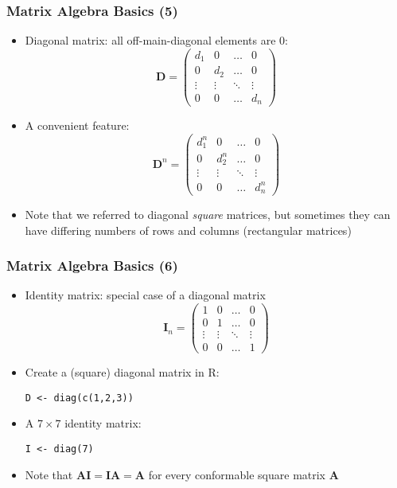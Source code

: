 \documentclass[10pt]{beamer}
\theoremstyle{definition}
\begin{document}
\begin{frame}[fragile]
\frametitle{Matrix Algebra Basics (5)}
\begin{itemize}
	\item Diagonal matrix: all off-main-diagonal elements are 0:
	\[
		\mathbf{D} = 
		\begin{pmatrix}
		d_{1} & 0 & \ldots & 0\\
		0 & d_{2} & \ldots & 0\\
		\vdots & \vdots & \ddots & \vdots\\
		0 & 0 & \ldots & d_{n}
		\end{pmatrix}
	\]
	\item A convenient feature:
	\[
		\mathbf{D}^{n} = 
		\begin{pmatrix}
		d_{1}^{n} & 0 & \ldots & 0\\
		0 & d_{2}^{n} & \ldots & 0\\
		\vdots & \vdots & \ddots & \vdots\\
		0 & 0 & \ldots & d_{n}^{n}
		\end{pmatrix}
	\]
	\item Note that we referred to diagonal \textit{square} matrices, but sometimes they can have differing numbers of rows and columns (rectangular matrices)
\end{itemize}
\end{frame}

\begin{frame}[fragile]
\frametitle{Matrix Algebra Basics (6)}
\begin{itemize}
	\item Identity matrix: special case of a diagonal matrix
	\[
		\mathbf{I}_{n} = 
		\begin{pmatrix}
		1 & 0 & \ldots & 0\\
		0 & 1 & \ldots & 0\\
		\vdots & \vdots & \ddots & \vdots\\
		0 & 0 & \ldots & 1
		\end{pmatrix}
	\]
	\item Create a (square) diagonal matrix in R:
	\begin{lstlisting}[style = rstyle, breaklines]
	D <- diag(c(1,2,3))	
	\end{lstlisting}
	\item A $7\times 7$ identity matrix:
	\begin{lstlisting}[style = rstyle, breaklines]
	I <- diag(7)	
	\end{lstlisting}
	\item Note that $\mathbf{AI = IA = A}$ for every conformable square matrix $\mathbf{A}$
\end{itemize}
\end{frame}
\end{document}
